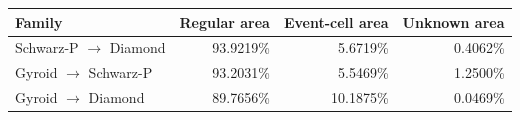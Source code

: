 \begin{tabular}{lrrr}\toprule
Family & Regular area & Event-cell area & Unknown area \\ \midrule
Schwarz-P $\to$ Diamond & 93.9219\% & 5.6719\% & 0.4062\% \\
Gyroid $\to$ Schwarz-P & 93.2031\% & 5.5469\% & 1.2500\% \\
Gyroid $\to$ Diamond & 89.7656\% & 10.1875\% & 0.0469\% \\
\bottomrule\end{tabular}